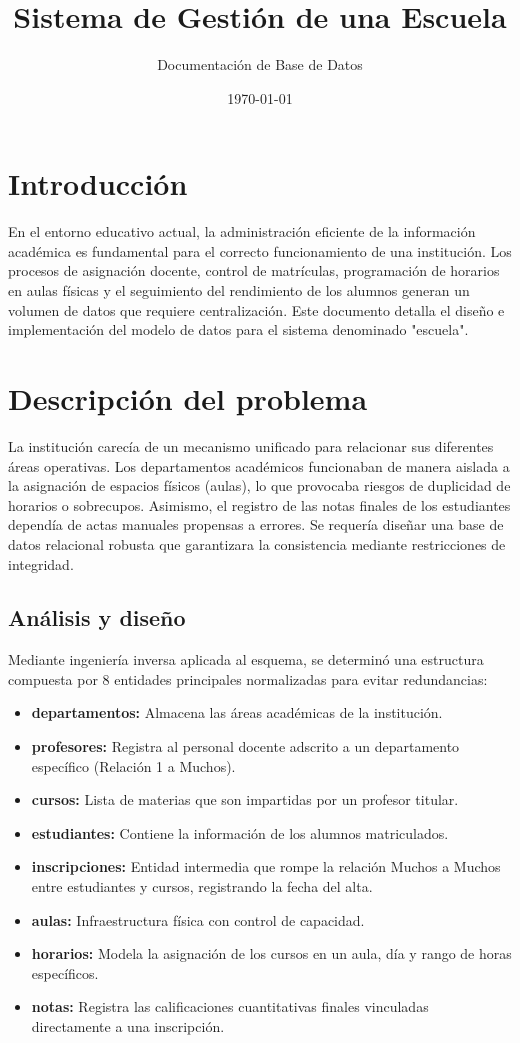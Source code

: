 \documentclass[10pt,letterpaper]{article}
\title{Sistema de Gestión de una Escuela}
\author{Documentación de Base de Datos}
\date{\today}
\begin{document}
\maketitle
\tableofcontents
\lstlistoflistings

\section{Introducción}
En el entorno educativo actual, la administración eficiente de la información académica es fundamental para el correcto funcionamiento de una institución. Los procesos de asignación docente, control de matrículas, programación de horarios en aulas físicas y el seguimiento del rendimiento de los alumnos generan un volumen de datos que requiere centralización. Este documento detalla el diseño e implementación del modelo de datos para el sistema denominado "escuela".

\section{Descripción del problema}
La institución carecía de un mecanismo unificado para relacionar sus diferentes áreas operativas. Los departamentos académicos funcionaban de manera aislada a la asignación de espacios físicos (aulas), lo que provocaba riesgos de duplicidad de horarios o sobrecupos. Asimismo, el registro de las notas finales de los estudiantes dependía de actas manuales propensas a errores. Se requería diseñar una base de datos relacional robusta que garantizara la consistencia mediante restricciones de integridad.

\subsection{Análisis y diseño}
Mediante ingeniería inversa aplicada al esquema, se determinó una estructura compuesta por 8 entidades principales normalizadas para evitar redundancias:
\begin{itemize}
    \item \textbf{departamentos:} Almacena las áreas académicas de la institución.
    \item \textbf{profesores:} Registra al personal docente adscrito a un departamento específico (Relación 1 a Muchos).
    \item \textbf{cursos:} Lista de materias que son impartidas por un profesor titular.
    \item \textbf{estudiantes:} Contiene la información de los alumnos matriculados.
    \item \textbf{inscripciones:} Entidad intermedia que rompe la relación Muchos a Muchos entre estudiantes y cursos, registrando la fecha del alta.
    \item \textbf{aulas:} Infraestructura física con control de capacidad.
    \item \textbf{horarios:} Modela la asignación de los cursos en un aula, día y rango de horas específicos.
    \item \textbf{notas:} Registra las calificaciones cuantitativas finales vinculadas directamente a una inscripción.
\end{itemize}
\end{document}
